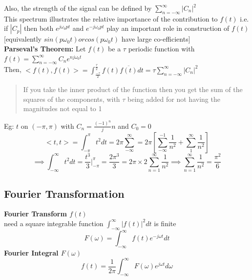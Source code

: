 \documentclass[11pt]{article}
\theoremstyle{definition}
\begin{document}
Also, the strength of the signal can be defined by $\sum_{n=-\infty}^\infty |C_n|^2 $\\
This spectrum illustrates the relative importance of the contribution to $f(t)$ i.e. if $|C_p|$ then both $e^{j\omega_0 pt}$ and $e^{-j\omega_0 pt}$ play an important role in construction of $f(t)$ [equivalently $sin(p\omega_0 t) or cos(p\omega_0 t)$ have large co-efficients]\\
\hfill\break
\textbf{Parseval's Theorem:} Let $f(t)$ be a $\tau$ periodic function with $f(t) = \sum_{n=-\infty}^\infty C_n e^{nj\omega_0 t} $\\
Then, $<f(t), f(t)> = \int^{\frac{\tau}{2}}_{\frac{-\tau}{2}} f(t)\overline{f(t)}dt = \tau \sum_{n=-\infty}^\infty |C_n|^2$

\begin{quote}
If you take the inner product of the function then you get the sum of the squares of the components, with $\tau$ being added for not having the magnitudes not equal to 1
\end{quote}
Eg: $t$ on $(-\pi, \pi)$ with $C_n = \frac{(-1)^n}j{n}$ and $C_0 = 0$\\
$$<t, t> = \int^\pi_{-\pi}t^2dt = 2\pi \sum_{-\infty}^\infty = 2\pi [\sum_{-\infty}^{-1}\frac{1}{n^2} + \sum_1^\infty\frac{1}{n^2}]$$
$$\implies \int_{-\infty}^\infty t^2 dt = \frac{t^3}{3}|^\pi_{-\pi} = \frac{2\pi^3}{3} = 2\pi \times 2 \sum_{n =1}^\infty \frac{1}{n^2} \implies \sum_{n =1}^\infty \frac{1}{n^2} = \frac{\pi^2}{6}$$

\clearpage
\subsection{Fourier Transformation}
\textbf{Fourier Transform $f(t)$}\\
need a square integrable function $\int^{\infty}_{-\infty}|f(t)|^2dt$ is finite\\
$$F(\omega) = \int^{\infty}_{-\infty} f(t)e^{-j\omega t}dt$$
\textbf{Fourier Integral $F(\omega)$}\\
$$f(t) = \frac{1}{2\pi}\int^{\infty}_{-\infty} F(\omega)e^{j\omega t}d\omega$$
\end{document}
